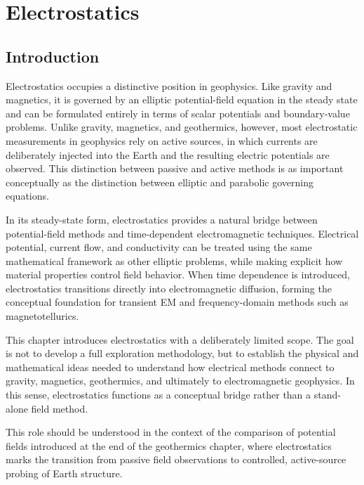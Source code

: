 \chapter{Electrostatics}\label{ch:electrostatics}

\section{Introduction}
Electrostatics occupies a distinctive position in geophysics. Like gravity and magnetics, it is governed by an elliptic potential-field equation in the steady state and can be formulated entirely in terms of scalar potentials and boundary-value problems. Unlike gravity, magnetics, and geothermics, however, most electrostatic measurements in geophysics rely on active sources, in which currents are deliberately injected into the Earth and the resulting electric potentials are observed. This distinction between passive and active methods is as important conceptually as the distinction between elliptic and parabolic governing equations.

In its steady-state form, electrostatics provides a natural bridge between potential-field methods and time-dependent electromagnetic techniques. Electrical potential, current flow, and conductivity can be treated using the same mathematical framework as other elliptic problems, while making explicit how material properties control field behavior. When time dependence is introduced, electrostatics transitions directly into electromagnetic diffusion, forming the conceptual foundation for transient EM and frequency-domain methods such as magnetotellurics.

This chapter introduces electrostatics with a deliberately limited scope. The goal is not to develop a full exploration methodology, but to establish the physical and mathematical ideas needed to understand how electrical methods connect to gravity, magnetics, geothermics, and ultimately to electromagnetic geophysics. In this sense, electrostatics functions as a conceptual bridge rather than a stand-alone field method.

This role should be understood in the context of the comparison of potential fields introduced at the end of the geothermics chapter, where electrostatics marks the transition from passive field observations to controlled, active-source probing of Earth structure.


